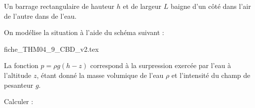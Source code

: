 \finEntrainement




\newpage




\hauteurLargeurCadreReponse		{7mm}{3cm}
\typeEntrainement				{} %
\initialisationEntrainement

Un barrage rectangulaire de hauteur $h$ et de largeur $L$ baigne d'un côté dans l'air de l'autre dans de l'eau. 

On modélise la situation à l'aide du schéma suivant :

\def\ratioScaleImage{1.2}
\begin{center}
{fiche_THM04_9_CBD_v2.tex}
\end{center}

La fonction $p=\rho g (h-z)$ correspond à la surpression exercée par l'eau à l'altitude $z$, étant donné la masse volumique de l'eau $\rho$ et l'intensité du champ de pesanteur $g$. 

Calculer :
\debutEntrainement



